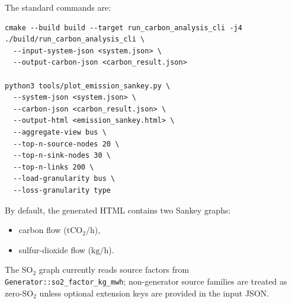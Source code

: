 The standard commands are:
\begin{verbatim}
cmake --build build --target run_carbon_analysis_cli -j4
./build/run_carbon_analysis_cli \
  --input-system-json <system.json> \
  --output-carbon-json <carbon_result.json>

python3 tools/plot_emission_sankey.py \
  --system-json <system.json> \
  --carbon-json <carbon_result.json> \
  --output-html <emission_sankey.html> \
  --aggregate-view bus \
  --top-n-source-nodes 20 \
  --top-n-sink-nodes 30 \
  --top-n-links 200 \
  --load-granularity bus \
  --loss-granularity type
\end{verbatim}

By default, the generated HTML contains two Sankey graphs:
\begin{itemize}
  \item carbon flow (\(\mathrm{tCO_2/h}\)),
  \item sulfur-dioxide flow (\(\mathrm{kg/h}\)).
\end{itemize}
The SO\(_2\) graph currently reads source factors from
\texttt{Generator::so2\_factor\_kg\_mwh}; non-generator source families are
treated as zero-SO\(_2\) unless optional extension keys are provided in the
input JSON.
